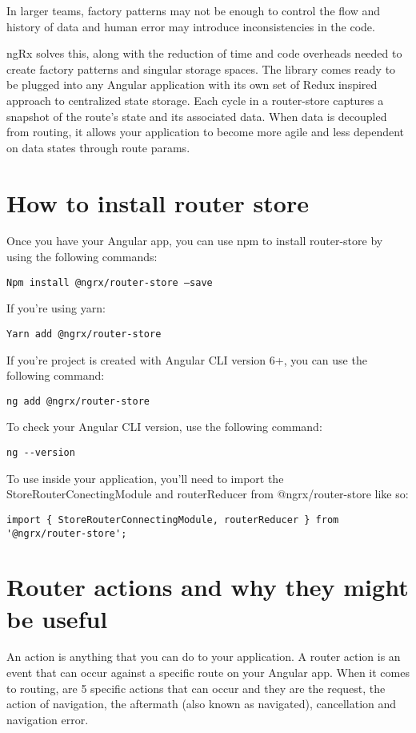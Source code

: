 In larger teams, factory patterns may not be enough to control the flow and
history of data and human error may introduce inconsistencies in the code.

ngRx solves this, along with the reduction of time and code overheads needed to
create factory patterns and singular storage spaces. The library comes ready to
be plugged into any Angular application with its own set of Redux inspired
approach to centralized state storage. Each cycle in a router-store captures a
snapshot of the route’s state and its associated data. When data is decoupled
from routing, it allows your application to become more agile and less dependent
on data states through route params.

\section{How to install router store}
Once you have your Angular app, you can use npm to install router-store by using the following commands:

\begin{verbatim}
Npm install @ngrx/router-store –save
\end{verbatim}

If you’re using yarn:
\begin{verbatim}
Yarn add @ngrx/router-store
\end{verbatim}

If you’re project is created with Angular CLI version 6+, you can use the
following command:

\begin{verbatim}
ng add @ngrx/router-store
\end{verbatim}

To check your Angular CLI version, use the following command:
\begin{verbatim}
ng --version
\end{verbatim}

To use inside your application, you’ll need to import the StoreRouterConectingModule and routerReducer from @ngrx/router-store like so:

\begin{lstlisting}
import { StoreRouterConnectingModule, routerReducer } from '@ngrx/router-store';
\end{lstlisting}

\section{Router actions and why they might be useful}
An action is anything that you can do to your application. A router action is an
event that can occur against a specific route on your Angular app. When it comes
to routing, are 5 specific actions that can occur and they are the request, the
action of navigation, the aftermath (also known as navigated), cancellation and
navigation error.

